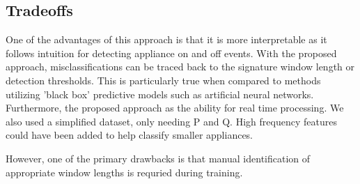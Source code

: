 \documentclass[conference]{IEEEtran}
\begin{document}
\subsection{Tradeoffs}
One of the advantages of this approach is that it is more interpretable as it follows intuition for detecting appliance on and off events.  With the proposed approach, misclassifications can be traced back to the signature window length or detection thresholds.  This is particularly true when compared to methods utilizing 'black box' predictive models such as artificial neural networks.  Furthermore, the proposed approach as the ability for real time processing. We also used a simplified dataset, only needing P and Q.  High frequency features could have been added to help classify smaller appliances.

However, one of the primary drawbacks is that manual identification of appropriate window lengths is requried during training.









%
%







%
%
%

%
%

%






\end{document}
